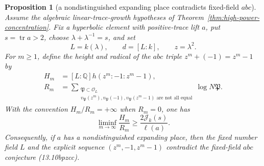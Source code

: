 \documentclass[11pt,reqno]{amsart}
\newtheorem{proposition}[theorem]{Proposition}
\theoremstyle{definition}
\theoremstyle{remark}
\newcommand{\Q}{\mathbb Q}
\newcommand{\cO}{\mathcal O}
\newcommand{\Tr}{\operatorname{tr}}
\begin{document}
\begin{proposition}[a nondistinguished expanding place contradicts fixed-field \(abc\)]
\label{prop:hidden-place-abc-quality}
Assume the algebraic linear-trace-growth hypotheses of
Theorem~\ref{thm:high-power-concentration}.  Fix a hyperbolic element
with positive-trace lift \(a\), put \(s=\Tr a>2\), choose
\(\lambda+\lambda^{-1}=s\), and set
\[
 L=k(\lambda),\qquad d=[L:k],\qquad z=\lambda^2.
\]
For \(m\ge1\), define the height and radical of the \(abc\) triple
\(z^m+(-1)=z^m-1\) by
\[
 \begin{aligned}
 H_m&=[L:\Q]h(z^m:-1:z^m-1),\\
 R_m&=\sum_{\substack{\mathfrak P\subset\cO_L\\
 v_{\mathfrak P}(z^m),v_{\mathfrak P}(-1),
 v_{\mathfrak P}(z^m-1)\text{ are not all equal}}}
 \log N\mathfrak P.
 \end{aligned}
\tag{13.10bpzj}
\]
With the convention \(H_m/R_m=+\infty\) when \(R_m=0\), one has
\[
 \liminf_{m\to\infty}\frac{H_m}{R_m}
 \ge \frac{2\mathcal J_k(s)}{\ell(a)}.
\tag{13.10bpzk}
\]
Consequently, if \(a\) has a nondistinguished expanding place, then the
fixed number field \(L\) and the explicit sequence
\((z^m,-1,z^m-1)\) contradict the fixed-field \(abc\) conjecture
(13.10bpzcc).
\end{proposition}
\end{document}
